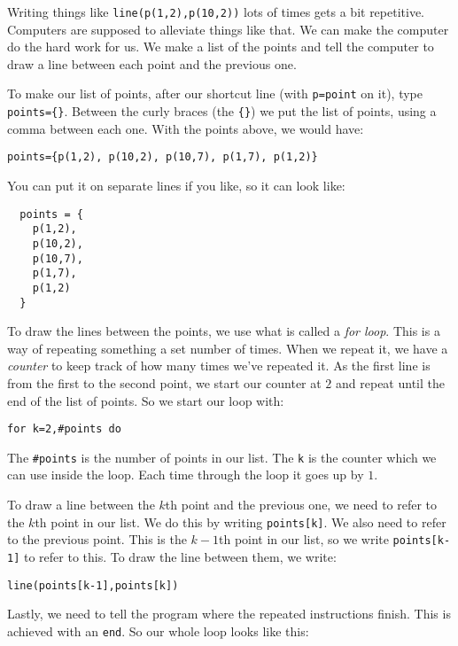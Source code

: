 \documentclass[
  xhtml,%
  use filename%
]{internet}
\begin{document}
Writing things like \verb+line(p(1,2),p(10,2))+ lots of times gets a bit repetitive.
Computers are supposed to alleviate things like that.
We can make the computer do the hard work for us.
We make a list of the points and tell the computer to draw a line between each point and the previous one.

To make our list of points, after our shortcut line (with \verb+p=point+ on it), type \verb+points={}+.
Between the curly braces (the \verb+{}+) we put the list of points, using a comma between each one.
With the points above, we would have:

\begin{verbatim}
points={p(1,2), p(10,2), p(10,7), p(1,7), p(1,2)}
\end{verbatim}

You can put it on separate lines if you like, so it can look like:

\begin{verbatim}
  points = {
    p(1,2),
    p(10,2),
    p(10,7),
    p(1,7),
    p(1,2)
  }
\end{verbatim}

To draw the lines between the points, we use what is called a \emph{for loop}.
This is a way of repeating something a set number of times.
When we repeat it, we have a \emph{counter} to keep track of how many times we've repeated it.
As the first line is from the first to the second point, we start our counter at \(2\) and repeat until the end of the list of points.
So we start our loop with:

\begin{verbatim}
for k=2,#points do
\end{verbatim}

The \verb+#points+ is the number of points in our list.
The \verb+k+ is the counter which we can use inside the loop.
Each time through the loop it goes up by \(1\).

To draw a line between the \(k\)th point and the previous one, we need to refer to the \(k\)th point in our list.
We do this by writing \verb+points[k]+.
We also need to refer to the previous point.
This is the \(k-1\)th point in our list, so we write \verb+points[k-1]+ to refer to this.
To draw the line between them, we write:

\begin{verbatim}
line(points[k-1],points[k])
\end{verbatim}

Lastly, we need to tell the program where the repeated instructions finish.
This is achieved with an \verb+end+.
So our whole loop looks like this:
\end{document}
